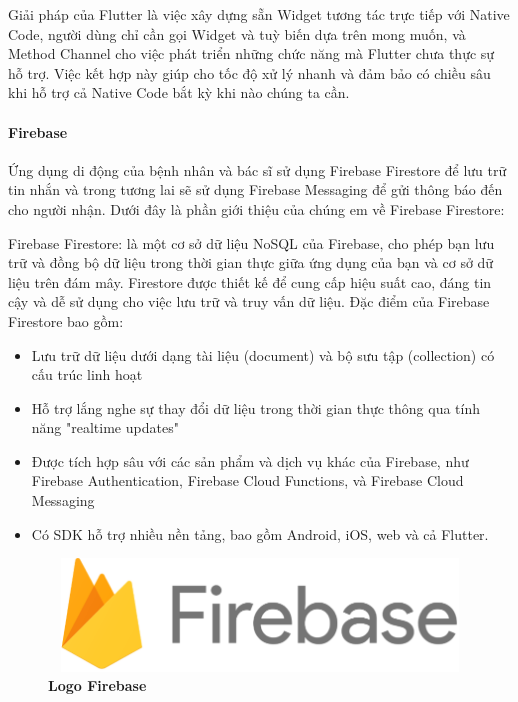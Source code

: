 Giải pháp của Flutter là việc xây dựng sẵn Widget tương tác trực tiếp với Native Code, người dùng chỉ cần gọi Widget và tuỳ
biến dựa trên mong muốn, và Method Channel cho việc phát triển những chức năng mà Flutter chưa thực sự hỗ trợ. Việc kết hợp này
giúp cho tốc độ xử lý nhanh và đảm bảo có chiều sâu khi hỗ trợ cả Native Code bắt kỳ khi nào chúng ta cần.


\paragraph{Firebase}
\mbox{}

Ứng dụng di động của bệnh nhân và bác sĩ sử dụng Firebase Firestore để lưu trữ tin nhắn và trong tương lai sẽ sử dụng Firebase
Messaging để gửi thông báo đến cho người nhận. Dưới đây là phần giới thiệu của chúng em về Firebase Firestore:

Firebase Firestore: là một cơ sở dữ liệu NoSQL của Firebase, cho phép bạn lưu trữ và đồng bộ dữ liệu trong thời gian thực giữa ứng dụng của bạn và cơ sở dữ liệu trên đám mây. Firestore được thiết kế để cung cấp hiệu suất cao, đáng tin cậy và dễ sử dụng cho việc lưu trữ và truy vấn dữ liệu.
Đặc điểm của Firebase Firestore bao gồm:
\begin{itemize} 
  \item Lưu trữ dữ liệu dưới dạng tài liệu (document) và bộ sưu tập (collection) có cấu trúc linh hoạt
  \item Hỗ trợ lắng nghe sự thay đổi dữ liệu trong thời gian thực thông qua tính năng "realtime updates"
  \item Được tích hợp sâu với các sản phẩm và dịch vụ khác của Firebase, như Firebase Authentication, Firebase Cloud Functions, và Firebase Cloud Messaging
  \item Có SDK hỗ trợ nhiều nền tảng, bao gồm Android, iOS, web và cả Flutter.
\end{itemize}

\begin{figure}[H]
  \centering
  \includegraphics[width=12cm,height=3cm]{Images/firebase_cover.png}
  \caption[Logo Firebase]{\bfseries \fontsize{12pt}{0pt}
  \selectfont Logo Firebase}
  \label{firebase_cover} %
\end{figure}

